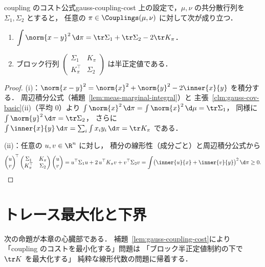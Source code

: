 \begin{lemma}{coupling のコスト公式}{gauss-coupling-cost}
  上の設定で，$\mu,\nu$ の共分散行列を $\Sigma_1,\Sigma_2$ とすると，
  任意の $\pi\in\Couplings(\mu,\nu)$ に対して次が成り立つ．
  \begin{enumerate}
    \item $\displaystyle\int\norm{x-y}^2\,\d\pi
      =\tr\Sigma_1+\tr\Sigma_2-2\tr K_\pi$．
    \item ブロック行列
      $\begin{pmatrix}\Sigma_1&K_\pi\\K_\pi^\top&\Sigma_2\end{pmatrix}$
      は半正定値である．
  \end{enumerate}
\end{lemma}

\begin{proof}
  (i)：$\norm{x-y}^2=\norm{x}^2+\norm{y}^2-2\inner{x}{y}$ を積分する．
  周辺積分公式（補題~\ref{lem:meas-marginal-integral}）と
  主張~\ref{clm:gauss-cov-basic}(ii)（平均 $0$）より
  $\int\norm{x}^2\,\d\pi=\int\norm{x}^2\,\d\mu=\tr\Sigma_1$，
  同様に $\int\norm{y}^2\,\d\pi=\tr\Sigma_2$，
  さらに $\int\inner{x}{y}\,\d\pi=\sum_i\int x_iy_i\,\d\pi=\tr K_\pi$ である．

  (ii)：任意の $u,v\in\R^n$ に対し，
  積分の線形性（成分ごと）と周辺積分公式から
  \[
    \begin{pmatrix}u\\v\end{pmatrix}^{\!\top}
    \begin{pmatrix}\Sigma_1&K_\pi\\K_\pi^\top&\Sigma_2\end{pmatrix}
    \begin{pmatrix}u\\v\end{pmatrix}
    =u^\top\Sigma_1u+2\,u^\top K_\pi v+v^\top\Sigma_2v
    =\int\bigl(\inner{u}{x}+\inner{v}{y}\bigr)^2\,\d\pi
    \geq0.  \qedhere
  \]
\end{proof}

\section{トレース最大化と下界}
\label{sec:gauss-lower-bound}

次の命題が本章の心臓部である．
補題~\ref{lem:gauss-coupling-cost}により
「coupling のコストを最小化する」問題は
「ブロック半正定値制約の下で $\tr K$ を最大化する」
純粋な線形代数の問題に帰着する．

